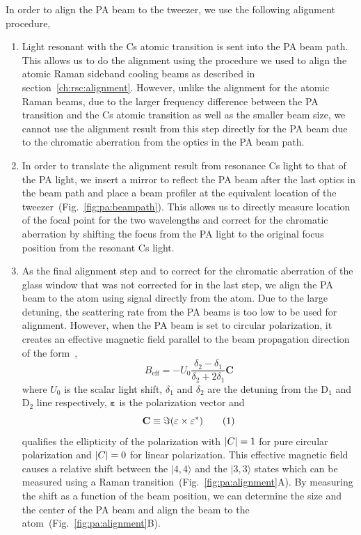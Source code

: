 In order to align the PA beam to the tweezer, we use the following alignment procedure,
\begin{enumerate}
\item Light resonant with the Cs atomic transition is sent into the PA beam path.
  This allows us to do the alignment using the procedure we used to align the
  atomic Raman sideband cooling beams as described in section~\ref{ch:rsc:alignment}.
  However, unlike the alignment for the atomic Raman beams,
  due to the larger frequency difference between the PA transition and the Cs atomic
  transition as well as the smaller beam size,
  we cannot use the alignment result from this step directly for the PA beam
  due to the chromatic aberration from the optics in the PA beam path.
\item In order to translate the alignment result from resonance Cs light to that of the PA light,
  we insert a mirror to reflect the PA beam after the last optics in the beam path
  and place a beam profiler at the equivalent location of
  the tweezer~(Fig.~\ref{fig:pa:beampath}).
  This allows us to directly measure location of the focal point for the two wavelengths
  and correct for the chromatic aberration by shifting the focus from the PA light
  to the original focus position from the resonant Cs light.
\item As the final alignment step and to correct for the chromatic aberration of the
  glass window that was not corrected for in the last step,
  we align the PA beam to the atom using signal directly from the atom.
  Due to the large detuning, the scattering rate from the PA beams
  is too low to be used for alignment.
  However, when the PA beam is set to circular polarization, it creates an effective
  magnetic field parallel to the beam propagation direction
  of the form~\cite{thompson_coherence_2013},
  \[ B_{\mathrm{eff}}=-U_0\frac{\delta_2-\delta_1}{\delta_2+2\delta_1}\mathbf{C} \]
  where $U_0$ is the scalar light shift, $\delta_1$ and $\delta_2$ are the detuning from the
  $\mathrm{D}_1$ and $\mathrm{D}_2$ line respectively,
  $\mathbf{\varepsilon}$ is the polarization vector and
  \[\mathbf{C}\equiv\Im\paren{\mathbf{\varepsilon}\times\mathbf{\varepsilon}^*}
    \numberthis{eq:pa:beampath:def-c}\]
  qualifies the ellipticity of the polarization with
  ${\left|{C}\right|}=1$ for pure circular polarization and ${\left|{C}\right|}=0$ for linear polarization.
  This effective magnetic field causes a relative shift between the $|4,4\rangle$
  and the $|3,3\rangle$ states which can be measured using
  a Raman transition~(Fig.~\ref{fig:pa:alignment}A).
  By measuring the shift as a function of the beam position,
  we can determine the size and the center of the PA beam and align the beam to
  the atom~(Fig.~\ref{fig:pa:alignment}B).
\end{enumerate}

